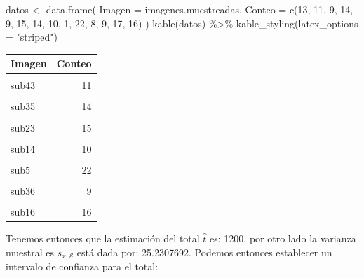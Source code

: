 \documentclass[
]{book}
\newenvironment{Shaded}{\begin{snugshade}}{\end{snugshade}}
\newcommand{\AttributeTok}[1]{\textcolor[rgb]{0.77,0.63,0.00}{#1}}
\newcommand{\DecValTok}[1]{\textcolor[rgb]{0.00,0.00,0.81}{#1}}
\newcommand{\FunctionTok}[1]{\textcolor[rgb]{0.00,0.00,0.00}{#1}}
\newcommand{\NormalTok}[1]{#1}
\newcommand{\OtherTok}[1]{\textcolor[rgb]{0.56,0.35,0.01}{#1}}
\newcommand{\SpecialCharTok}[1]{\textcolor[rgb]{0.00,0.00,0.00}{#1}}
\newcommand{\StringTok}[1]{\textcolor[rgb]{0.31,0.60,0.02}{#1}}
\begin{document}
\begin{Shaded}
\begin{Highlighting}[]
\NormalTok{datos }\OtherTok{\textless{}{-}} \FunctionTok{data.frame}\NormalTok{(}
  \AttributeTok{Imagen =}\NormalTok{ imagenes.muestreadas,}
  \AttributeTok{Conteo =} \FunctionTok{c}\NormalTok{(}\DecValTok{13}\NormalTok{, }\DecValTok{11}\NormalTok{, }\DecValTok{9}\NormalTok{, }\DecValTok{14}\NormalTok{, }\DecValTok{9}\NormalTok{, }\DecValTok{15}\NormalTok{, }\DecValTok{14}\NormalTok{, }\DecValTok{10}\NormalTok{, }\DecValTok{1}\NormalTok{, }\DecValTok{22}\NormalTok{, }\DecValTok{8}\NormalTok{, }\DecValTok{9}\NormalTok{, }\DecValTok{17}\NormalTok{, }\DecValTok{16}\NormalTok{)}
\NormalTok{)}
\FunctionTok{kable}\NormalTok{(datos) }\SpecialCharTok{\%\textgreater{}\%} \FunctionTok{kable\_styling}\NormalTok{(}\AttributeTok{latex\_options =} \StringTok{"striped"}\NormalTok{)}
\end{Highlighting}
\end{Shaded}

\begin{table}
\centering
\begin{tabular}{l|r}
\hline
Imagen & Conteo\\
\hline
\cellcolor{gray!6}{sub52} & \cellcolor{gray!6}{13}\\
\hline
sub43 & 11\\
\hline
\cellcolor{gray!6}{sub34} & \cellcolor{gray!6}{9}\\
\hline
sub35 & 14\\
\hline
\cellcolor{gray!6}{sub54} & \cellcolor{gray!6}{9}\\
\hline
sub23 & 15\\
\hline
\cellcolor{gray!6}{sub83} & \cellcolor{gray!6}{14}\\
\hline
sub14 & 10\\
\hline
\cellcolor{gray!6}{sub79} & \cellcolor{gray!6}{1}\\
\hline
sub5 & 22\\
\hline
\cellcolor{gray!6}{sub30} & \cellcolor{gray!6}{8}\\
\hline
sub36 & 9\\
\hline
\cellcolor{gray!6}{sub39} & \cellcolor{gray!6}{17}\\
\hline
sub16 & 16\\
\hline
\end{tabular}
\end{table}

Tenemos entonces que la estimación del total \(\hat{t}\) es: 1200, por otro lado la varianza muestral es \(s_{x,\mathcal{S}}\) está dada por: 25.2307692. Podemos entonces establecer un intervalo de confianza para el total:
\end{document}
